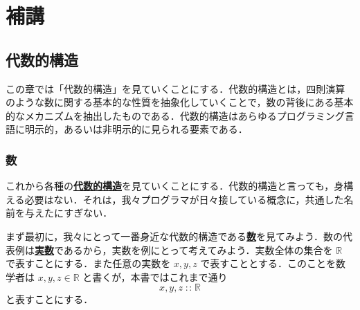 \documentclass[a4paper,twocolumn]{jsbook}
\newenvironment{leader}{\begingroup\gt}{\endgroup}
\newcommand{\keyword}[1]{{\underline{\textbf{#1}}}}
\DeclareMathOperator{\mIn}{{:\!:}}
\newcommand{\mSpecialSet}[1]{\mathbb{#1}} %
\newcommand{\mRSet}{\mSpecialSet{R}}
\begin{document}
\part{補講}


\chapter{代数的構造}

\begin{leader}
この章では「代数的構造」を見ていくことにする．代数的構造とは，四則演算のような数に関する基本的な性質を抽象化していくことで，数の背後にある基本的なメカニズムを抽出したものである．代数的構造はあらゆるプログラミング言語に明示的，あるいは非明示的に見られる要素である．
\end{leader}

\section{数}

これから各種の\keyword{代数的構造}を見ていくことにする．代数的構造と言っても，身構える必要はない．それは，我々プログラマが日々接している概念に，共通した名前を与えたにすぎない．

まず最初に，我々にとって一番身近な代数的構造である\keyword{数}を見てみよう．数の代表例は\keyword{実数}であるから，実数を例にとって考えてみよう．実数全体の集合を $\mRSet$ で表すことにする．また任意の実数を $x,y,z$ で表すこととする．このことを数学者は $x,y,z\in\mRSet$ と書くが，本書ではこれまで通り
\begin{equation}
x,y,z\mIn\mRSet
\end{equation}
と表すことにする．
\end{document}
